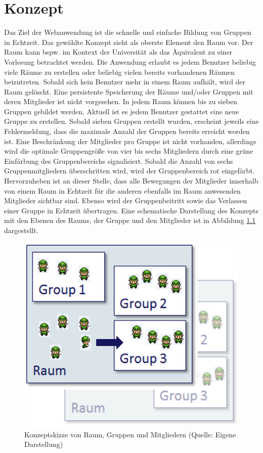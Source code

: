 \chapter{Konzept}
\label{konzept}

Das Ziel der Webanwendung ist die schnelle und einfache Bildung von Gruppen in Echtzeit. Das gewählte Konzept sieht als oberste Element den Raum vor. Der Raum kann bspw. im Kontext der Universität als das Äquivalent zu einer Vorlesung betrachtet werden. Die Anwendung erlaubt es jedem Benutzer beliebig viele Räume zu erstellen oder beliebig vielen bereits vorhandenen Räumen beizutreten. Sobald sich kein Benutzer mehr in einem Raum aufhält, wird der Raum gelöscht. Eine persistente Speicherung der Räume und/oder Gruppen mit deren Mitglieder ist nicht vorgesehen. 
\newline\newline
In jedem Raum können bis zu sieben Gruppen gebildet werden. Aktuell ist es jedem Benutzer gestattet eine neue Gruppe zu erstellen. Sobald sieben Gruppen erstellt wurden, erscheint jeweils eine Fehlermeldung, dass die maximale Anzahl der Gruppen bereits erreicht worden ist. Eine Beschränkung der Mitglieder pro Gruppe ist nicht vorhanden, allerdings wird die optimale Gruppengröße von vier bis sechs Mitgliedern durch eine grüne Einfärbung des Gruppenbereichs signalisiert. Sobald die Anzahl von sechs Gruppenmitgliedern überschritten wird, wird der Gruppenbereich rot eingefärbt. Hervorzuheben ist an dieser Stelle, dass alle Bewegungen der Mitglieder innerhalb von einem Raum in Echtzeit für die anderen ebenfalls im Raum anwesenden Mitglieder sichtbar sind. Ebenso wird der Gruppenbeitritt sowie das Verlassen einer Gruppe in Echtzeit übertragen. Eine schematische Darstellung des Konzepts mit den Ebenen des Raums, der Gruppe und den Mitglieder ist in Abbildung \ref{konzeptskizze} dargestellt.

\begin{figure}[h]
\centering
\includegraphics[width=0.35\linewidth]{graphiken/konzeptskizze.png}%
\caption{Konzeptskizze von Raum, Gruppen und Mitgliedern (Quelle: Eigene Darstellung)}%
\label{konzeptskizze}%
\end{figure}

